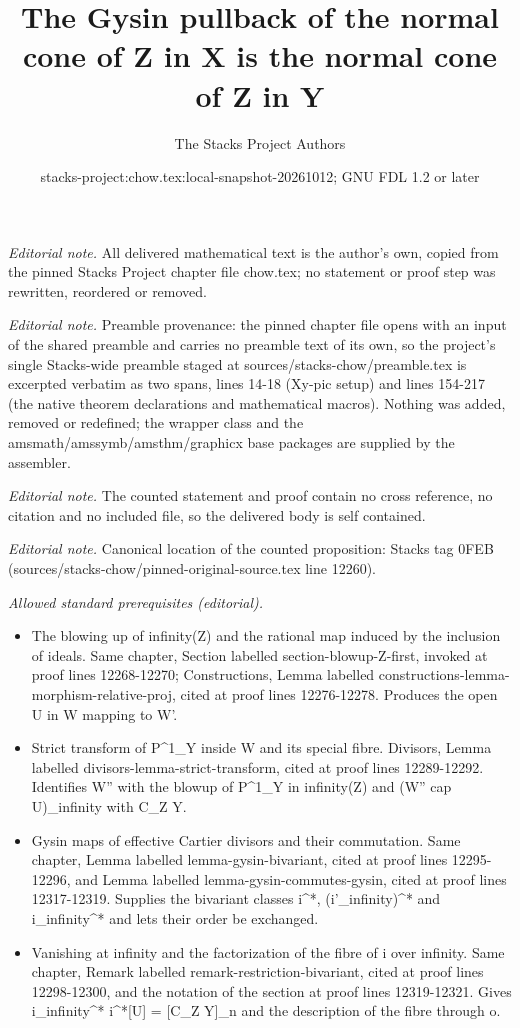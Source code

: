\documentclass[10pt,a4paper]{amsart}
\title{The Gysin pullback of the normal cone of Z in X is the normal cone of Z in Y}
\author{The Stacks Project Authors}
\date{stacks-project:chow.tex:local-snapshot-20261012; GNU FDL 1.2 or later}
\theoremstyle{plain}
\theoremstyle{definition}
\theoremstyle{remark}
\numberwithin{equation}{subsection}
\begin{document}
\maketitle
\noindent\textit{Editorial note.} All delivered mathematical text is the author's own, copied from the pinned Stacks Project chapter file chow.tex; no statement or proof step was rewritten, reordered or removed.\par\medskip
\noindent\textit{Editorial note.} Preamble provenance: the pinned chapter file opens with an input of the shared preamble and carries no preamble text of its own, so the project's single Stacks-wide preamble staged at sources/stacks-chow/preamble.tex is excerpted verbatim as two spans, lines 14-18 (Xy-pic setup) and lines 154-217 (the native theorem declarations and mathematical macros). Nothing was added, removed or redefined; the wrapper class and the amsmath/amssymb/amsthm/graphicx base packages are supplied by the assembler.\par\medskip
\noindent\textit{Editorial note.} The counted statement and proof contain no cross reference, no citation and no included file, so the delivered body is self contained.\par\medskip
\noindent\textit{Editorial note.} Canonical location of the counted proposition: Stacks tag 0FEB (sources/stacks-chow/pinned-original-source.tex line 12260).\par\medskip
\noindent\textit{Allowed standard prerequisites (editorial).}\begin{itemize}
\item The blowing up of infinity(Z) and the rational map induced by the inclusion of ideals. Same chapter, Section labelled section-blowup-Z-first, invoked at proof lines 12268-12270; Constructions, Lemma labelled constructions-lemma-morphism-relative-proj, cited at proof lines 12276-12278. Produces the open U in W mapping to W'.
\item Strict transform of P\textasciicircum{}1\_Y inside W and its special fibre. Divisors, Lemma labelled divisors-lemma-strict-transform, cited at proof lines 12289-12292. Identifies W'' with the blowup of P\textasciicircum{}1\_Y in infinity(Z) and (W'' cap U)\_infinity with C\_Z Y.
\item Gysin maps of effective Cartier divisors and their commutation. Same chapter, Lemma labelled lemma-gysin-bivariant, cited at proof lines 12295-12296, and Lemma labelled lemma-gysin-commutes-gysin, cited at proof lines 12317-12319. Supplies the bivariant classes i\textasciicircum{}*, (i'\_infinity)\textasciicircum{}* and i\_infinity\textasciicircum{}* and lets their order be exchanged.
\item Vanishing at infinity and the factorization of the fibre of i over infinity. Same chapter, Remark labelled remark-restriction-bivariant, cited at proof lines 12298-12300, and the notation of the section at proof lines 12319-12321. Gives i\_infinity\textasciicircum{}* i\textasciicircum{}*[U] = [C\_Z Y]\_n and the description of the fibre through o.
\end{itemize}\medskip
\end{document}
